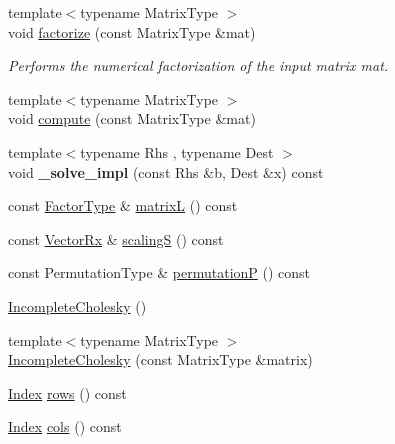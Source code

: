 \begin{DoxyCompactItemize}
{\footnotesize template$<$typename Matrix\+Type $>$ }\\void \hyperlink{class_eigen_1_1_incomplete_cholesky_ac39c75ff7ca5d2db9a9f03b937e12601}{factorize} (const Matrix\+Type \&mat)
\begin{DoxyCompactList}\small\item\em Performs the numerical factorization of the input matrix {\itshape mat}. \end{DoxyCompactList}\item 
{\footnotesize template$<$typename Matrix\+Type $>$ }\\void \hyperlink{class_eigen_1_1_incomplete_cholesky_a7966bedeebbeaa7a8fe4dd1da3797a0b}{compute} (const Matrix\+Type \&mat)
\item 
\mbox{\label{class_eigen_1_1_incomplete_cholesky_a7df2a13e73f1ac4a2fc7a6524bd93f84}} 
{\footnotesize template$<$typename Rhs , typename Dest $>$ }\\void {\bfseries \+\_\+solve\+\_\+impl} (const Rhs \&b, Dest \&x) const
\item 
const \hyperlink{group___sparse_core___module}{Factor\+Type} \& \hyperlink{class_eigen_1_1_incomplete_cholesky_a7d1f1878505fd1862e6f2286d27ff09a}{matrixL} () const
\item 
const \hyperlink{group___core___module}{Vector\+Rx} \& \hyperlink{class_eigen_1_1_incomplete_cholesky_a30d66dd77147a84ec3302e7d5fe5d924}{scalingS} () const
\item 
const Permutation\+Type \& \hyperlink{class_eigen_1_1_incomplete_cholesky_a0d52cec5e17f485a362766363ba90b02}{permutationP} () const
\item 
\hyperlink{class_eigen_1_1_incomplete_cholesky_adaaa3975b8cf53f910d6a3344af92379}{Incomplete\+Cholesky} ()
\item 
{\footnotesize template$<$typename Matrix\+Type $>$ }\\\hyperlink{class_eigen_1_1_incomplete_cholesky_a757499fc814988a5b112b1f34d0295e1}{Incomplete\+Cholesky} (const Matrix\+Type \&matrix)
\item 
\hyperlink{namespace_eigen_a62e77e0933482dafde8fe197d9a2cfde}{Index} \hyperlink{class_eigen_1_1_incomplete_cholesky_a4780a83266c871782595081021268b5a}{rows} () const
\item 
\hyperlink{namespace_eigen_a62e77e0933482dafde8fe197d9a2cfde}{Index} \hyperlink{class_eigen_1_1_incomplete_cholesky_a0d66a1c8e340617e7ff404e63186fedb}{cols} () const
\item 

\end{DoxyCompactItemize}
